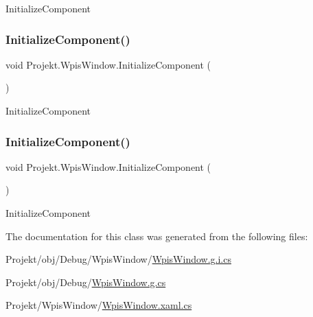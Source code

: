 Initialize\+Component 

\mbox{\label{class_projekt_1_1_wpis_window_a88a28d6acd2b4dc8de2f1272c9c23f8d}} 
\subsubsection{\texorpdfstring{InitializeComponent()}{InitializeComponent()}\hspace{0.1cm}{\footnotesize\ttfamily [2/3]}}
{\footnotesize\ttfamily void Projekt.\+Wpis\+Window.\+Initialize\+Component (\begin{DoxyParamCaption}{ }\end{DoxyParamCaption})}



Initialize\+Component 

\mbox{\label{class_projekt_1_1_wpis_window_a88a28d6acd2b4dc8de2f1272c9c23f8d}} 
\subsubsection{\texorpdfstring{InitializeComponent()}{InitializeComponent()}\hspace{0.1cm}{\footnotesize\ttfamily [3/3]}}
{\footnotesize\ttfamily void Projekt.\+Wpis\+Window.\+Initialize\+Component (\begin{DoxyParamCaption}{ }\end{DoxyParamCaption})}



Initialize\+Component 



The documentation for this class was generated from the following files\+:\begin{DoxyCompactItemize}
\item 
Projekt/obj/\+Debug/\+Wpis\+Window/\mbox{\hyperlink{_wpis_window_2_wpis_window_8g_8i_8cs}{Wpis\+Window.\+g.\+i.\+cs}}\item 
Projekt/obj/\+Debug/\mbox{\hyperlink{_wpis_window_8g_8cs}{Wpis\+Window.\+g.\+cs}}\item 
Projekt/\+Wpis\+Window/\mbox{\hyperlink{_wpis_window_8xaml_8cs}{Wpis\+Window.\+xaml.\+cs}}\end{DoxyCompactItemize}

